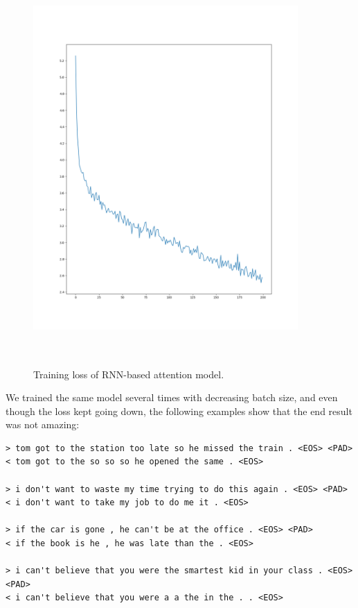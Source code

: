 \documentclass{article}
\begin{document}
\begin{figure}[h!]
    \captionsetup{width=0.8\textwidth}
    \includegraphics[width=0.9\textwidth, height=15cm]{RNN-loss-part1.png}
    \caption{%
        Training loss of RNN-based attention model.
    }\label{fig:rnnLoss}
\end{figure}

We trained the same model several times with decreasing batch size, and even
though the loss kept going down, the following examples show that the end result
was not amazing:

\begin{verbatim}
> tom got to the station too late so he missed the train . <EOS> <PAD>
< tom got to the so so so he opened the same . <EOS>

> i don't want to waste my time trying to do this again . <EOS> <PAD>
< i don't want to take my job to do me it . <EOS>

> if the car is gone , he can't be at the office . <EOS> <PAD>
< if the book is he , he was late than the . <EOS>

> i can't believe that you were the smartest kid in your class . <EOS> <PAD>
< i can't believe that you were a a the in the . . <EOS>
\end{verbatim}
\end{document}
